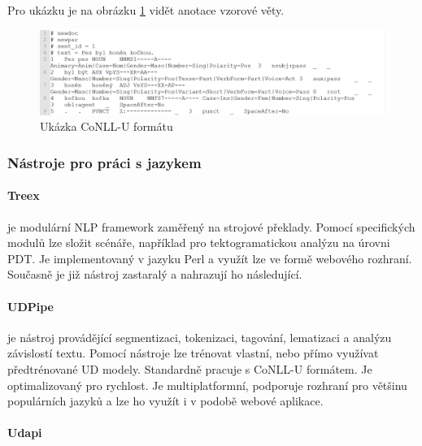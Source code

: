 \documentclass[thesis=M,czech]{FITthesis}[2019/12/23]
\newenvironment{example}{\begin{adjustwidth}{1cm}{}}{\end{adjustwidth}}
\begin{document}
\begin{example}
Pro ukázku je na obrázku \ref{fig:conlluexample} vidět anotace vzorové věty.
    
\begin{figure}\centering
	\includegraphics[width=1\textwidth]{images/conllu_example.PNG}
	\caption{Ukázka CoNLL-U formátu}\label{fig:conlluexample}
\end{figure}
\end{example}


\subsubsection{Nástroje pro práci s jazykem}

\paragraph{Treex}

je modulární NLP framework zaměřený na strojové překlady\cite{Treex}. Pomocí specifických modulů lze složit scénáře, například pro tektogramatickou analýzu na úrovni PDT. Je implementovaný v jazyku Perl a využít lze ve formě webového rozhraní. Současně je již nástroj zastaralý a nahrazují ho následující.

\paragraph{UDPipe}

je nástroj provádějící segmentizaci, tokenizaci, tagování, lematizaci a analýzu závislostí textu\cite{UDPipe}. Pomocí nástroje lze trénovat vlastní, nebo přímo využívat předtrénované UD modely. Standardně pracuje s CoNLL-U formátem. Je optimalizovaný pro rychlost. Je multiplatformní, podporuje rozhraní pro většinu populárních jazyků a lze ho využít i v podobě webové aplikace.

\paragraph{Udapi}
\end{document}
